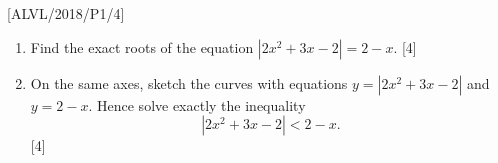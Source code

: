 \item {[}ALVL/2018/P1/4{]}
\begin{enumerate}
\item Find the exact roots of the equation $\left|2x^{2}+3x-2\right|=2-x$.
\hfill{}{[}4{]}
\item On the same axes, sketch the curves with equations $y=\left|2x^{2}+3x-2\right|$
and $y=2-x$. Hence solve exactly the inequality
\[
\left|2x^{2}+3x-2\right|<2-x.
\]
\hfill{}{[}4{]}
\end{enumerate}
